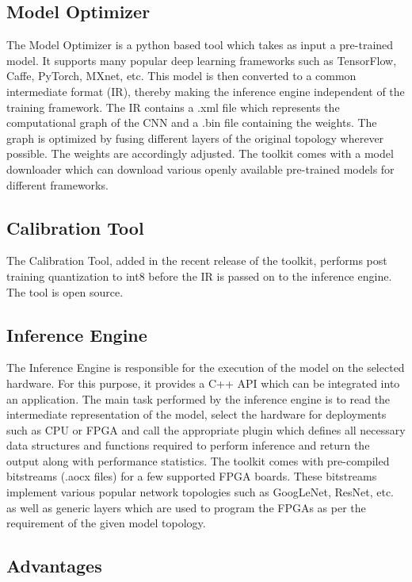 \documentclass[titlepage]{report}
\begin{document}
\subsection{Model Optimizer}
The Model Optimizer is a python based tool which takes as input a pre-trained model. It supports many popular deep learning frameworks such as TensorFlow, Caffe, PyTorch, MXnet, etc. This model is then converted to a common intermediate format (IR), thereby making the inference engine independent of the training framework. The IR contains a .xml file which represents the computational graph of the CNN and a .bin file containing the weights. The graph is optimized by fusing different layers of the original topology wherever possible. The weights are accordingly adjusted. The toolkit comes with a model downloader which can download various openly available pre-trained models for different frameworks.
 
\subsection{Calibration Tool}
The Calibration Tool, added in the recent release of the toolkit, performs post training quantization to int8 before the IR is passed on to the inference engine.  The tool is open source. 
 
 \subsection{Inference Engine}
 The Inference Engine is responsible for the execution of the model on the selected hardware. For this purpose, it provides a C++ API which can be integrated into an application. The main task performed by the inference engine is to read the intermediate representation of the model, select the hardware for deployments such as CPU or FPGA and call the appropriate plugin which defines all necessary data structures and functions required to perform inference and return the output along with performance statistics. 
 The toolkit comes with pre-compiled bitstreams (.aocx files) for a few supported FPGA boards. These bitstreams implement various popular network topologies such as GoogLeNet, ResNet, etc. as well as generic layers which are used to program the FPGAs as per the requirement of the given model topology.
 
 \subsection{Advantages}
  
\end{document}
